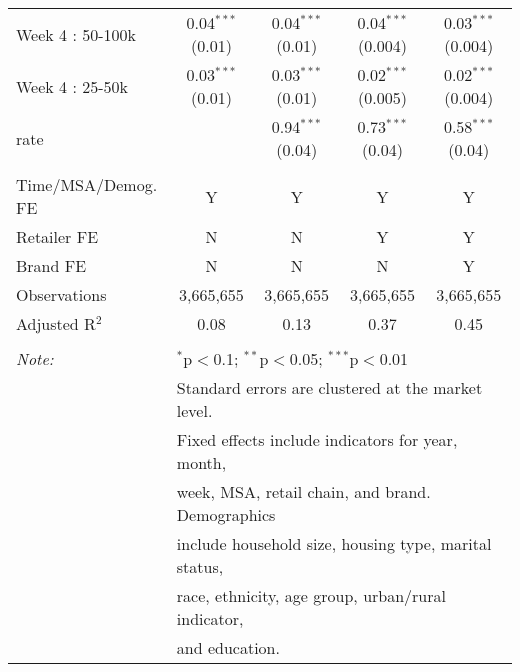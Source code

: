 \begin{table}[!htbp]
\begin{tabular}{@{\extracolsep{5pt}}lcccc}
  Week 4 : 50-100k & 0.04$^{***}$ (0.01) & 0.04$^{***}$ (0.01) & 0.04$^{***}$ (0.004) & 0.03$^{***}$ (0.004) \\ 
  Week 4 : 25-50k & 0.03$^{***}$ (0.01) & 0.03$^{***}$ (0.01) & 0.02$^{***}$ (0.005) & 0.02$^{***}$ (0.004) \\ 
  rate &  & 0.94$^{***}$ (0.04) & 0.73$^{***}$ (0.04) & 0.58$^{***}$ (0.04) \\ 
 \hline \\[-1.8ex] 
Time/MSA/Demog. FE & Y & Y & Y & Y \\ 
Retailer FE & N & N & Y & Y \\ 
Brand FE & N & N & N & Y \\ 
Observations & 3,665,655 & 3,665,655 & 3,665,655 & 3,665,655 \\ 
Adjusted R$^{2}$ & 0.08 & 0.13 & 0.37 & 0.45 \\ 
\hline 
\hline \\[-1.8ex] 
\textit{Note:}  & \multicolumn{4}{l}{$^{*}$p$<$0.1; $^{**}$p$<$0.05; $^{***}$p$<$0.01} \\ 
 & \multicolumn{4}{l}{Standard errors are clustered at the market level.} \\ 
 & \multicolumn{4}{l}{Fixed effects include indicators for year, month, } \\ 
 & \multicolumn{4}{l}{week, MSA, retail chain, and brand. Demographics } \\ 
 & \multicolumn{4}{l}{include household size, housing type, marital status, } \\ 
 & \multicolumn{4}{l}{race, ethnicity, age group, urban/rural indicator, } \\ 
 & \multicolumn{4}{l}{and education.} \\ 
\end{tabular} 
\end{table} 
